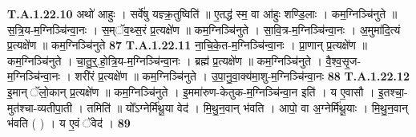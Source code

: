 \documentclass[17pt]{extarticle}
\begin{document}
                  \newline
                                                                  \textbf{ T.A.1.22.10} \newline
                  अथो॑ आहुः । सर्वे॑षु यज्ञ्क्र॒तुष्विति॑ ॥  ए॒तद्ध॑ स्म॒ वा आ॑हुः शण्डि॒लाः । कम॒ग्निञ्चि॑नुते ॥ स॒त्रि॒य-म॒ग्निञ्चि॑न्वा॒नः ।  स॒म्ॅव॒थ्स॒रं प्र॒त्यक्षे॑ण ॥ कम॒ग्निञ्चि॑नुते । सा॒वि॒त्र-म॒ग्निञ्चि॑न्वा॒नः । अ॒मुमा॑दि॒त्यं प्र॒त्यक्षे॑ण ॥ कम॒ग्निञ्चि॑नुते \textbf{ 87} \newline
                  \newline
                                                                  \textbf{ T.A.1.22.11} \newline
                  ना॒चि॒के॒त-म॒ग्निञ्चि॑न्वा॒नः । प्रा॒णान् प्र॒त्यक्षे॑ण ॥ कम॒ग्निञ्चि॑नुते । चा॒तु॒र्॒.हो॒त्रि॒य-म॒ग्निञ्चि॑न्वा॒नः । ब्रह्म॑ प्र॒त्यक्षे॑ण ॥ कम॒ग्निञ्चि॑नुते ।  वै॒श्व॒सृ॒ज-म॒ग्निञ्चि॑न्वा॒नः । शरी॑रं प्र॒त्यक्षे॑ण ॥ कम॒ग्निञ्चि॑नुते ।  उ॒पा॒नु॒वा॒क्य॑मा॒शु-म॒ग्निञ्चि॑न्वा॒नः \textbf{ 88} \newline
                  \newline
                                                                  \textbf{ T.A.1.22.12} \newline
                  इ॒मान् ॅलो॒कान् प्र॒त्यक्षे॑ण ॥ कम॒ग्निञ्चि॑नुते ।  इ॒ममा॑रुण-केतुक-म॒ग्निञ्चि॑न्वा॒न इति॑ । य ए॒वासौ ।  इ॒तश्चा॒-मुत॑श्चा-व्यतीपा॒ती । तमिति॑ ॥ यो᳚ऽग्नेर्मि॑थू॒या वेद॑ । मि॒थु॒न॒वान् भ॑वति । आपो॒ वा अ॒ग्नेर्मि॑थू॒याः ।  मि॒थु॒न॒वान् भ॑वति ( ) । य ए॒वं ॅवेद॑ । \textbf{ 89} \newline
                  \newline
                                                  
\end{document}
